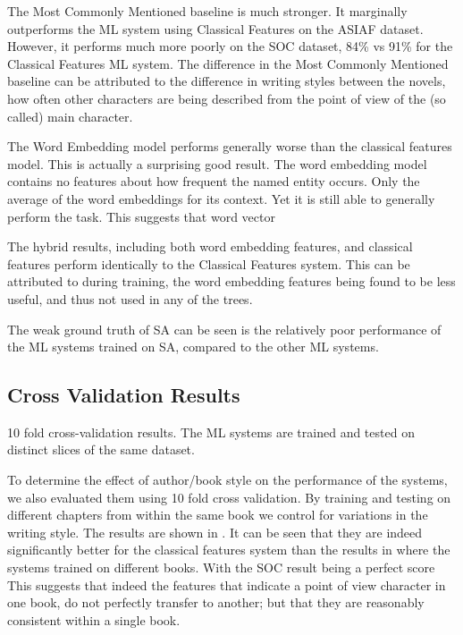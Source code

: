 \documentclass[11pt,a4paper]{article}
\begin{document}
The Most Commonly Mentioned baseline is much stronger.
It marginally outperforms the ML system using Classical Features on the ASIAF dataset.
However, it performs much more poorly on the SOC dataset, 84\% vs 91\% for the Classical Features ML system.
The difference in the Most Commonly Mentioned baseline can be attributed to the difference in writing styles between the novels, how often other characters are being described from the point of view of the (so called) main character.

The Word Embedding model performs generally worse than the classical features model.
This is actually a surprising good result.
The word embedding model contains no features about how frequent the named entity occurs.
Only the average of the word embeddings for its context.
Yet it is still able to generally perform the task.
This suggests that word vector 

The hybrid results, including both word embedding features, and classical features perform identically to the Classical Features system.
This can be attributed to during training, the word embedding features being found to be less useful, and thus not used in any of the trees.

The weak ground truth of SA can be seen is the relatively poor performance of the ML systems trained on SA, compared to the other ML systems.



\subsection{Cross Validation Results}

\begin{table}
	\begin{adjustbox}{max width=\textwidth}
	\end{adjustbox}
	
	\caption{10 fold cross-validation results. The ML systems are trained and tested on distinct slices of the same dataset. \label{tbl:rescross}}
\end{table}

To determine the effect of author/book style on the performance of the systems,
we also evaluated them using 10 fold cross validation.
By training and testing on different chapters from within the same book we control for variations in the writing style.
The results are shown in  .
It can be seen that they are indeed significantly better for the classical features system than the results in  where the systems trained on different books.
With the SOC result being a perfect score
This suggests that indeed the features that indicate a point of view character in one book, do not perfectly transfer to another; but that they are reasonably consistent within a single book.
\end{document}
